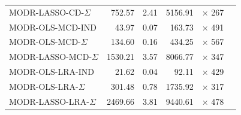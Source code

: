\begin{tabular}{lrrrrr}
MODR-LASSO-CD-$\Sigma$ & {\cellcolor[HTML]{0E59A2}} \color[HTML]{F1F1F1} 752.57 & {\cellcolor[HTML]{084A91}} \color[HTML]{F1F1F1} 2.41 & {\cellcolor[HTML]{09529D}} \color[HTML]{F1F1F1} 5156.91 & {\cellcolor[HTML]{0E59A2}} \color[HTML]{F1F1F1} $\times$ 267 \\
MODR-OLS-MCD-IND & {\cellcolor[HTML]{77B5D9}} \color[HTML]{000000} 43.97 & {\cellcolor[HTML]{E0ECF8}} \color[HTML]{000000} 0.07 & {\cellcolor[HTML]{DFEBF7}} \color[HTML]{000000} 163.73 & {\cellcolor[HTML]{083776}} \color[HTML]{F1F1F1} $\times$ 491 \\
MODR-OLS-MCD-$\Sigma$ & {\cellcolor[HTML]{4493C7}} \color[HTML]{F1F1F1} 134.60 & {\cellcolor[HTML]{B2D2E8}} \color[HTML]{000000} 0.16 & {\cellcolor[HTML]{ABD0E6}} \color[HTML]{000000} 434.25 & {\cellcolor[HTML]{08306B}} \color[HTML]{F1F1F1} $\times$ 567 \\
MODR-LASSO-MCD-$\Sigma$ & {\cellcolor[HTML]{084184}} \color[HTML]{F1F1F1} 1530.21 & {\cellcolor[HTML]{083370}} \color[HTML]{F1F1F1} 3.57 & {\cellcolor[HTML]{083877}} \color[HTML]{F1F1F1} 8066.77 & {\cellcolor[HTML]{084B93}} \color[HTML]{F1F1F1} $\times$ 347 \\
MODR-OLS-LRA-IND & {\cellcolor[HTML]{9DCAE1}} \color[HTML]{000000} 21.62 & {\cellcolor[HTML]{F7FBFF}} \color[HTML]{000000} 0.04 & {\cellcolor[HTML]{F7FBFF}} \color[HTML]{000000} 92.11 & {\cellcolor[HTML]{084082}} \color[HTML]{F1F1F1} $\times$ 429 \\
MODR-OLS-LRA-$\Sigma$ & {\cellcolor[HTML]{2777B8}} \color[HTML]{F1F1F1} 301.48 & {\cellcolor[HTML]{3A8AC2}} \color[HTML]{F1F1F1} 0.78 & {\cellcolor[HTML]{3F8FC5}} \color[HTML]{F1F1F1} 1735.92 & {\cellcolor[HTML]{08509B}} \color[HTML]{F1F1F1} $\times$ 317 \\
MODR-LASSO-LRA-$\Sigma$ & {\cellcolor[HTML]{08306B}} \color[HTML]{F1F1F1} 2469.66 & {\cellcolor[HTML]{08306B}} \color[HTML]{F1F1F1} 3.81 & {\cellcolor[HTML]{08306B}} \color[HTML]{F1F1F1} 9440.61 & {\cellcolor[HTML]{083979}} \color[HTML]{F1F1F1} $\times$ 478 \\
\bottomrule
\end{tabular}
